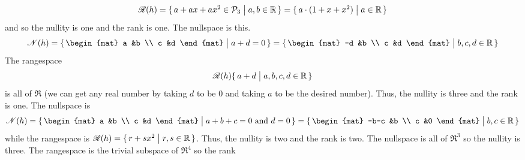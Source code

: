 \begin{exercises}
\begin{answer}
\begin{exparts}
          \begin{equation*}
            \mathscr{R}(h)
            =\mbox{$\{\,a+ax+ax^2\in\mathcal{P}_3\bigm| a,b\in\mathbb{R}\,\}$}
            =\mbox{$\{\,a\cdot(1+x+x^2)\bigm| a\in\mathbb{R}\,\}$}
          \end{equation*}
          and so the nullity is one and the rank is one.
        \partsitem The nullspace is this.
          \begin{equation*}
            \nullspace{h}
             =\set{\begin{mat}
                     a  &b  \\
                     c  &d
                   \end{mat} \suchthat a+d=0}
             =\set{\begin{mat}
                     -d  &b  \\
                      c  &d
                   \end{mat} \suchthat b,c,d\in\Re }
          \end{equation*}
          The rangespace
          \begin{equation*}
            \mathscr{R}(h)
             \mbox{$\{\,a+d\bigm| a,b,c,d\in\mathbb{R}\,\}$}
          \end{equation*}
          is all of $\Re$ (we can get any real number by
          taking $d$ to be $0$ and taking $a$ to be the desired number).
          Thus, the nullity is three and the rank is one.
        \partsitem The nullspace is
          \begin{equation*}
            \nullspace{h}=\set{\begin{mat}
                                 a     &b  \\
                                 c     &d
                               \end{mat} \suchthat 
                                 \text{$a+b+c=0$ and $d=0$}}
                         =\set{\begin{mat}
                                 -b-c  &b  \\
                                  c    &0
                               \end{mat} \suchthat b,c\in\Re }
          \end{equation*}
          while the rangespace is 
          $\mathscr{R}(h)=\mbox{$\{\,r+sx^2\bigm| r,s\in\mathbb{R}\,\}$}$.
          Thus, the nullity is two and the rank is two.
        \partsitem The nullspace is all of \( \Re^3 \) 
          so the nullity is three.
          The rangespace is the trivial subspace of \( \Re^4 \) so the rank

\end{exparts}
\end{answer}
\end{exercises}
